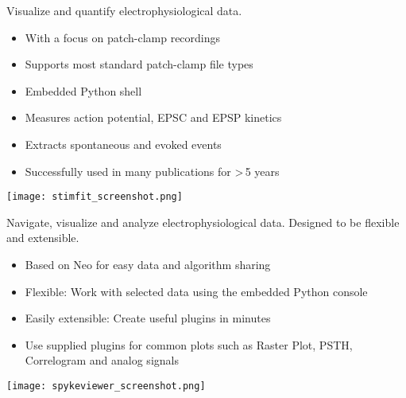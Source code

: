 \begin{multicols}{3}
Visualize and quantify electrophysiological data.
\begin{itemize}[nolistsep,topsep=0em,leftmargin=1pc]
\item With a focus on patch-clamp recordings
\item Supports most standard patch-clamp file types
\item Embedded Python shell
\item Measures action potential, EPSC and EPSP kinetics
\item Extracts spontaneous and evoked events
\item Successfully used in many publications for >\,5 years
\end{itemize}

\vspace{1em}
\texttt{[image: stimfit\_screenshot.png]}




Navigate, visualize and analyze electrophysiological data. Designed to be flexible and extensible.

\begin{itemize}[nolistsep,topsep=0em,leftmargin=1pc]
\item Based on Neo for easy data and algorithm sharing
\item Flexible: Work with selected data using the embedded Python console
\item Easily extensible: Create useful plugins in minutes
\item Use supplied plugins for common plots such as Raster Plot, PSTH, Correlogram and analog signals
\end{itemize}

\vspace{1em}
\texttt{[image: spykeviewer\_screenshot.png]}





\end{multicols}
